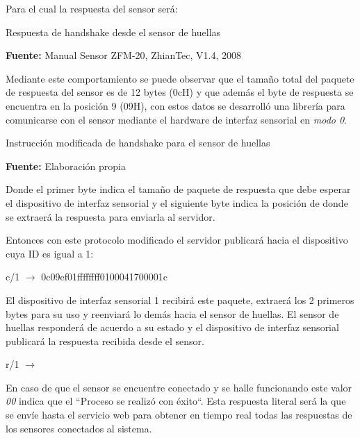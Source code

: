 \documentclass[../principal]{subfiles}
\begin{document}
  Para el cual la respuesta del sensor será:

  \begin{table}[H]
    \centering
    \caption{Respuesta de handshake desde el sensor de huellas}
    
    \caption*{\textbf{Fuente:} Manual Sensor ZFM-20, ZhianTec, V1.4, 2008 \cite{manual:fingerprint_ZFM-20}}
  \end{table}

  Mediante este comportamiento se puede observar que el tamaño total del paquete de respuesta del sensor es de 12 bytes (0cH) y que además el byte de respuesta se encuentra en la posición 9 (09H), con estos datos se desarrolló una librería para comunicarse con el sensor mediante el hardware de interfaz sensorial en \textit{modo 0}.

  \begin{table}[H]
    \centering
    \caption{Instrucción modificada de handshake para el sensor de huellas}
    
    \caption*{\textbf{Fuente:} Elaboración propia}
  \end{table}

  Donde el primer byte indica el tamaño de paquete de respuesta que debe esperar el dispositivo de interfaz sensorial y el siguiente byte indica la posición de donde se extraerá la respuesta para enviarla al servidor.

  Entonces con este protocolo modificado el servidor publicará hacia el dispositivo cuya ID es igual a 1:

  \begin{center}
    c/1 \quad $ \rightarrow $ \quad 0c09ef01ffffffff0100041700001c
  \end{center}

  El dispositivo de interfaz sensorial 1 recibirá este paquete, extraerá los 2 primeros bytes para su uso y reenviará lo demás hacia el sensor de huellas. El sensor de huellas responderá de acuerdo a su estado y el dispositivo de interfaz sensorial publicará la respuesta recibida desde el sensor.

  \begin{center}
    r/1 \quad $ \rightarrow $ 
  \end{center}

  En caso de que el sensor se encuentre conectado y se halle funcionando este valor \textit{00} indica que el ``Proceso se realizó con éxito``. Esta respuesta literal será la que se envíe hasta el servicio web para obtener en tiempo real todas las respuestas de los sensores conectados al sistema.
\end{document}

